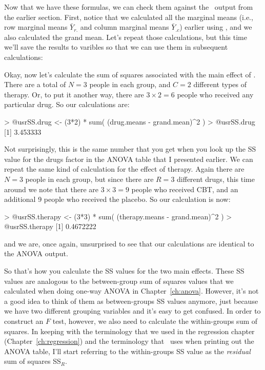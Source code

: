 Now that we have these formulas, we can check them against the \R\ output from the earlier section. First, notice that we calculated all the marginal means (i.e., row marginal means $\bar{Y}_{r.}$ and column marginal means $\bar{Y}_{.c}$) earlier using , and we also calculated the grand mean. Let's repeat those calculations, but this time we'll save the results to varibles so that we can use them in subsequent calculations:
Okay, now let's calculate the sum of squares associated with the main effect of . There are a total of $N=3$ people in each group, and $C=2$ different types of therapy. Or, to put it another way, there are $3 \times 2 = 6$ people who received any particular drug. So our calculations are:
\begin{rblock1}
> @usr{SS.drug <- (3*2) * sum( (drug.means - grand.mean)^2 )}
> @usr{SS.drug}
[1] 3.453333
\end{rblock1}
Not surprisingly, this is the same number that you get when you look up the SS value for the drugs factor in the ANOVA table that I presented earlier. We can repeat the same kind of calculation for the effect of therapy. Again there are $N=3$ people in each group, but since there are $R=3$ different drugs, this time around we note that there are $3 \times 3 = 9$ people who received CBT, and an additional 9 people who received the placebo. So our calculation is now:
\begin{rblock1}
> @usr{SS.therapy <- (3*3) * sum( (therapy.means - grand.mean)^2 )}
> @usr{SS.therapy}
[1] 0.4672222
\end{rblock1}
and we are, once again, unsurprised to see that our calculations are identical to the ANOVA output.

So that's how you calculate the SS values for the two main effects. These SS values are analogous to the between-group sum of squares values that we calculated when doing one-way ANOVA in Chapter~\ref{ch:anova}. However, it's not a good idea to think of them as between-groups SS values anymore, just because we have two different grouping variables and it's easy to get confused. In order to construct an $F$ test, however, we also need to calculate the within-groups sum of squares. In keeping with the terminology that we used in the regression chapter (Chapter~\ref{ch:regression}) and the terminology that \R\ uses when printing out the ANOVA table, I'll start referring to the within-groups SS value as the {\it residual} sum of squares SS$_R$. 

